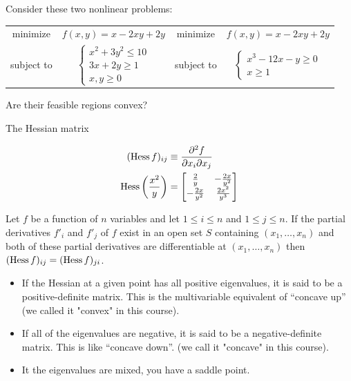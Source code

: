 \documentclass[c]{beamer}
\begin{document}
\begin{frame}[t]{}
  \begin{Exercise}
    Consider these two nonlinear problems\cite{carter}:
    \begin{center}
      \begin{tabular}{cc|cc}
        minimize & $f(x,y)=x-2xy+2y$ & minimize & $f(x,y)=x-2xy+2y$\\
        subject to & $\begin{cases}x^2+3y^2\leq10\\3x+2y\geq 1\\x,y\geq 0\end{cases}$ & 
        subject to & $\begin{cases}x^3-12x-y\geq 0\\x\geq 1\end{cases}$
      \end{tabular}
    \end{center}
    Are their feasible regions convex?
   \end{Exercise}
\end{frame}
\begin{frame}[allowframebreaks]{The Hessian matrix}

  \begin{align}
  (\operatorname{Hess} f)_{ij} &\equiv \frac{\partial^{2} f}{\partial x_{i} \partial x_{j} } \\
  \operatorname{Hess}\left( \frac{x^{2}}{y} \right) &=
  \begin{bmatrix}
    \frac{2}{y} & - \frac{2x}{y^{2}} \\
    -\frac{2x}{y^{2}} & \frac{2x^{2}}{y^{3}}
  \end{bmatrix}
\end{align}

Let $f$ be a function of $n$ variables and let $1 \leq i \leq n$ and $1 \leq j \leq n$. If the partial derivatives $f'_i$ and $f'_j$ of $f$ exist in an open set $S$ containing $(x_1,\ldots, x_n)$ and both of these partial derivatives are differentiable at $(x_1, \ldots, x_n)$ then $(\operatorname{Hess} f)_{ij}=(\operatorname{Hess} f)_{ji}$.

\begin{itemize}
  \item If the Hessian at a given point has all positive eigenvalues, it is said to be a positive-definite matrix. This is the multivariable equivalent of “concave up” (we called it "convex" in this course).
  \item If all of the eigenvalues are negative, it is said to be a negative-definite matrix. This is like “concave down”. (we call it "concave" in this course).
  \item It the eigenvalues are mixed, you have a saddle point.
\end{itemize}
\end{frame}
\end{document}
